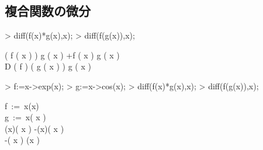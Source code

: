 \subsection{複合関数の微分}
\begin{MapleInput}
> diff(f(x)*g(x),x);
> diff(f(g(x)),x);
\end{MapleInput}
\begin{MapleOutputGather}
\left( {}f \left( x \right)  \right) g \left( x \right) +f \left( x \right) {}g \left( x \right) \notag \\
\mbox {D} \left( f \right)  \left( g \left( x \right)  \right) {}g \left( x \right) \notag
\end{MapleOutputGather}

\begin{MapleInput}
> f:=x->exp(x);
> g:=x->cos(x);
> diff(f(x)*g(x),x);
> diff(f(g(x)),x);
\end{MapleInput}
\begin{MapleOutputGather}
 f\, := \,x\mapsto \exp(x) \notag \\
 g\, := \,x\mapsto \cos \left( x \right)  \notag \\
  \exp(x)\cos \left( x \right) -\exp(x)\sin \left( x \right)  \notag \\
  -\sin \left( x \right) \exp(\cos x ) \notag
\end{MapleOutputGather}
